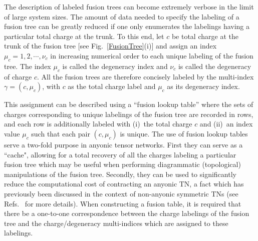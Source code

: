 \documentclass[aps,reprint,superscriptaddress,amsmath,amssymb,amsfonts,prb]{revtex4-1}
\begin{document}
The description of labeled fusion trees can become extremely verbose in the limit of large system sizes. The amount of data needed to specify the labeling of a fusion tree can be greatly reduced if one only enumerates the labelings having a particular total charge at the trunk. To this end, let $c$ be total charge at the trunk of the fusion tree [see Fig.~\ref{FusionTree}(i)] and assign an index $\mu_c = 1, 2, \cdots, \nu_c$ in increasing numerical order to each unique labeling of the fusion tree.  The index $\mu_c$ is called the degeneracy index and $\nu_c$ is called the degeneracy of charge $c$.\cite{Pfeifer2010a} All the fusion trees are therefore concisely labeled by the multi-index $\gamma=(c, \mu_c)$, with $c$ as the total charge label and $\mu_c$ as its degeneracy index. 


This assignment can be described using a ``fusion lookup table'' where the sets of charges corresponding to unique labelings of the fusion tree are recorded in rows, and each row is additionally labeled with (i)~the total charge $c$ and (ii)~an index value $\mu_c$ such that each pair $(c,\mu_c)$ is unique. The use of fusion lookup tables serve a two-fold purpose in anyonic tensor networks. First they can serve as a ``cache", allowing for a total recovery of all the charges labeling a particular fusion tree which may be useful when performing diagrammatic (topological) manipulations of the fusion tree. Secondly, they can be used to significantly reduce the computational cost of contracting an anyonic TN, a fact which has previously been discussed in the context of non-anyonic symmetric TNs (see Refs.~ for more details). When constructing a fusion table, it is required that there be a one-to-one correspondence between the charge labelings of the fusion tree and the 
charge/degeneracy multi-indices which are assigned to these labelings.
\end{document}
